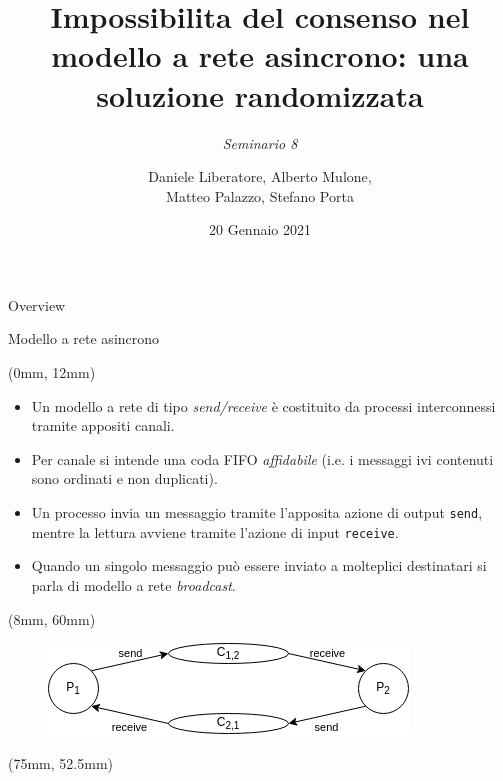 \documentclass{beamer}
\title[Seminario 8]{\textbf{Impossibilita del consenso nel modello a rete asincrono: una soluzione randomizzata}}
\subtitle{\scriptsize \textit{Seminario 8}}
\author[Liberatore, Mulone, Palazzo, Porta]{Daniele Liberatore, Alberto Mulone, \\ Matteo Palazzo, Stefano Porta}
\institute[]{Università degli Studi di Torino}
\date{20 Gennaio 2021}
\begin{document}
{
    \beamertemplatenavigationsymbolsempty
    \begin{frame}
        \titlepage
    \end{frame}
    \addtocounter{framenumber}{-1}
}

\begin{frame}{Overview}
    \tableofcontents
\end{frame}


\begin{frame}{Modello a rete asincrono}
\begin{textblock*}{\textwidth}(0mm, 12mm)
\begin{itemize}
    \item Un modello a rete di tipo \textit{send/receive} è costituito da processi interconnessi tramite appositi canali.
    \item Per canale si intende una coda FIFO \textit{affidabile} (i.e. i messaggi ivi contenuti sono ordinati e non duplicati).
    \item Un processo invia un messaggio tramite l'apposita azione di output \texttt{send}, mentre la lettura avviene tramite l'azione di input \texttt{receive}.
    \item Quando un singolo messaggio può essere inviato a molteplici destinatari si parla di modello a rete \textit{broadcast}.
\end{itemize}
\end{textblock*}
\begin{textblock*}{0.45\textwidth}(8mm, 60mm)
\begin{block}{}
    \begin{figure}
        \centering
        \includegraphics[scale=0.4]{modello_a_rete.png}
    \end{figure}
    \end{block}
\end{textblock*}
\begin{textblock*}{0.3\textwidth}(75mm, 52.5mm)
\begin{block}{}

\end{block}
\end{textblock*}
\end{frame}
\end{document}
